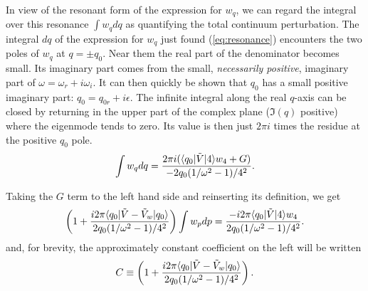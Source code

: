 \documentclass[12pt]{article}
\def\ket#1{|#1\rangle}
\def\bra#1{\langle#1}
\begin{document}
In view of the resonant form of the expression for $w_q$, we can regard the
integral over this resonance $\int w_q dq$ as quantifying the total
continuum perturbation.  The integral $dq$ of the expression for $w_q$
just found (\ref{eq:resonance}) encounters the two poles of $w_q$ at
$q=\pm q_0$.
Near them the real part of the denominator becomes small. Its
imaginary part comes from the small, \emph{necessarily positive},
imaginary part of
$\omega=\omega_r+i\omega_i$. It can then quickly be shown that
$q_0$ has a small positive imaginary part: $q_0=q_{0r}+i\epsilon$.
\iftrue%
The infinite integral along the real
$q$-axis can be closed by returning in the upper part of the complex
plane ($\Im(q)$ positive) where the eigenmode tends
to zero. Its value is then just $2\pi i$ times the residue at the positive $q_0$ pole.
\begin{equation}
  \label{poles}
  \int w_q dq 
  ={2\pi i(\bra{q_0}|\tilde{V}\ket{4}w_4+G)
    \over
    -2q_{0}(1/\omega^2-1)/4^2}.
\end{equation}
\else
A resonant integral for small positive
$\epsilon$ and real $q$ generally gives
\begin{equation}
  \label{resint}
  \int_{-}^{+} {g(q) dq\over \pm q_{0r} \pm i\epsilon-q}\simeq \mp
  i\pi g(\pm q_{0r})
\end{equation}
for any slowly varying function $g$.
On this basis
\footnote{Write the integral $\int{g(q)dq\over
  (q_{0r}+i\epsilon)^2-q^2}=\int{g(q)dq\over 
(q_{0r}+i\epsilon-q)(q_{0r}+i\epsilon+q)}\simeq \int{g(q_{0r})dq\over
  (q_{0r}+i\epsilon-q)2q_{0r}}-\int{g(-q_{0r})dq\over
  2q_{0r}(-q_{0r}-i\epsilon-q) }\simeq -i\pi [g(q_{0r})+g(-q_{0r})]/2q_{0r}. $ when
 $\epsilon$ is
positive. This treatment is equivalent to closing the $q$-integration path
along $+i\infty$ and setting the closed contour integral equal to
$2\pi i$ times only the residue at $q=q_{0r}+i\epsilon$.}
\begin{equation}
  \label{poles}
  \int w_q dq \simeq -i4\pi {(\bra{q_{0r}}|\tilde{V}\ket{4}
    +\bra{-q_{0r}}|\tilde{V}\ket{4})w_4+2G
    \over
    2q_{0r}(1/\omega^2-1)/4^2
  }
  =\sum_{q=\pm q_{0r}}{-i4\pi(\bra{q}|\tilde{V}\ket{4}w_4+G)
    \over
    2q_{0r}(1/\omega^2-1)/4^2}.
\end{equation}
\fi
Taking the $G$ term to the left hand side and reinserting its definition, we get
\begin{equation}
  \label{eq:22}
  \left(1+{i2\pi \bra{q_{0}}|\tilde{V}-\tilde{V}_{w}\ket{q_{0}}\over
      2q_{0}(1/\omega^2-1)/4^2}\right)\int w_pdp
  ={-i2\pi\bra{q_0}|\tilde{V}\ket{4}w_4
    \over
    2q_{0}(1/\omega^2-1)/4^2}.
\end{equation}
and, for brevity, the approximately constant coefficient on the left will
be written
\begin{equation}
  \label{eq:23}
  C \equiv
  \left(1+{i2\pi\bra{q_{0}}|\tilde{V}-\tilde{V}_{w}\ket{q_{0}}\over
      2q_{0}(1/\omega^2-1)/4^2}\right).
\end{equation}
\end{document}
